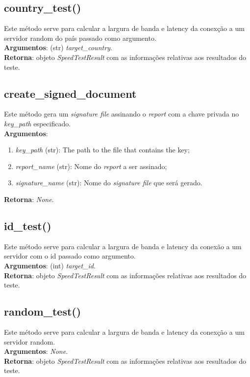 \documentclass{report}
\begin{document}
\subsection{country\_test()}
\label{subsec.countrytest}
\hspace{5mm}Este método serve para calcular a largura de banda e latency da conexção a um servidor random do país passado como argumento.\\ 
\hspace{5mm}\textbf{Argumentos}: (str) \textit{target\_country}.\\
\textbf{Retorna}: objeto \textit{SpeedTestResult} com as informações relativas aos resultados do teste.

\subsection{create\_signed\_document}
\label{subsec.signDoc}
\hspace{5mm}Este método gera um \textit{signature file} assinando o \textit{report} com a chave privada no \textit{key\_path} especificado.\\ 
\hspace{5mm}\textbf{Argumentos}: 
\begin{enumerate}
\item \textit{key\_path} (str): The path to the file that contains the key;
\item \textit{report\_name} (str): Nome do \textit{report} a ser assinado;
\item \textit{signature\_name} (str): Nome do \textit{signature file} que será gerado.	
\end{enumerate}
\textbf{Retorna}: \textit{None}.

\subsection{id\_test()}
\label{subsec.idtest}
\hspace{5mm}Este método serve para calcular a largura de banda e latency da conexão a um servidor com o id passado como argumento.\\ 
\hspace{5mm}\textbf{Argumentos}: (int) \textit{target\_id}.\\
\textbf{Retorna}: objeto \textit{SpeedTestResult} com as informações relativas aos resultados do teste.

\subsection{random\_test()}
\label{subsec.randt}
Este método serve para calcular a largura de banda e latency da conexção a um servidor random.\\ 
\textbf{Argumentos}: \textit{None}.\\
\textbf{Retorna}: objeto \textit{SpeedTestResult} com as informações relativas aos resultados do teste.
\end{document}
